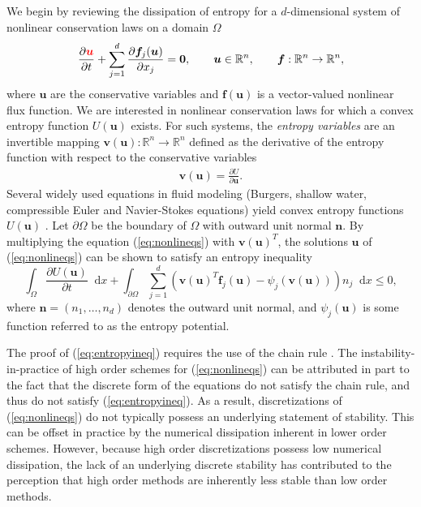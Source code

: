 \documentclass{svjour3}                     %
\newcommand*\diff[1]{\mathop{}\!{\mathrm{d}#1}}
\newcommand{\pd}[2]{\frac{\partial#1}{\partial#2}}
\newcommand{\LRp}[1]{\left( #1 \right)}
\newcommand{\rnote}[1]{{\color{red}{#1}}}
\begin{document}
We begin by reviewing the dissipation of entropy for a $d$-dimensional system of nonlinear conservation laws on a domain $\Omega$
\begin{equation}
\pd{\rnote{\bm{u}}}{t}  + \sum_{j=1}^d\pd{\bm{f}_j(\bm{u})}{x_j} = \bm{0}, \qquad \bm{u}\in \mathbb{R}^n, \qquad \bm{f}:\mathbb{R}^n\rightarrow\mathbb{R}^n,
\label{eq:nonlineqs}
\end{equation}
where $\bm{u}$ are the conservative variables and $\bm{f}(\bm{u})$ is a vector-valued nonlinear flux function.  We are interested in nonlinear conservation laws for which a convex entropy function $U(\bm{u})$ exists.  For such systems, the  \emph{entropy variables} are an invertible mapping $\bm{v}(\bm{u}):\mathbb{R}^n\rightarrow \mathbb{R}^n$ defined as the derivative of the entropy function with respect to the conservative variables 
\begin{align}
\bm{v}(\bm{u}) = \pd{U}{\bm{u}}.%
\label{eq:entropyvarsmap}
\end{align}
Several widely used equations in fluid modeling (Burgers, shallow water, compressible Euler and Navier-Stokes equations) yield convex entropy functions $U(\bm{u})$ \cite{hughes1986new, chen2017entropy}.  Let $\partial \Omega$ be the boundary of $\Omega$ with outward unit normal $\bm{n}$.  By multiplying the equation (\ref{eq:nonlineqs}) with $\bm{v}(\bm{u})^T$, the solutions $\bm{u}$ of (\ref{eq:nonlineqs}) can be shown to satisfy an entropy inequality
\begin{equation}
\int_{\Omega}\pd{U(\bm{u})}{t}\diff{x} + \int_{\partial \Omega} \sum_{j=1}^d \LRp{\bm{v}(\bm{u})^T\bm{f}_j(\bm{u}) - \psi_j\LRp{\bm{v}(\bm{u})}}n_j \diff{x} \leq 0, 
\label{eq:entropyineq}
\end{equation}
where $\bm{n} = \LRp{n_1,\ldots,n_d}$ denotes the outward unit normal, and $\psi_j(\bm{u})$ is some function referred to as the entropy potential.  

The proof of (\ref{eq:entropyineq}) requires the use of the chain rule \cite{mock1980systems, harten1983symmetric, dafermos2005compensated}.  The instability-in-practice of high order schemes for (\ref{eq:nonlineqs}) can be attributed in part to the fact that the discrete form of the equations do not satisfy the chain rule, and thus do not satisfy (\ref{eq:entropyineq}).  As a result, discretizations of (\ref{eq:nonlineqs}) do not typically possess an underlying statement of stability.  This can be offset in practice by the numerical dissipation inherent in lower order schemes.  However, because high order discretizations possess low numerical dissipation, the lack of an underlying discrete stability has contributed to the perception that high order methods are inherently less stable than low order methods.
\end{document}
